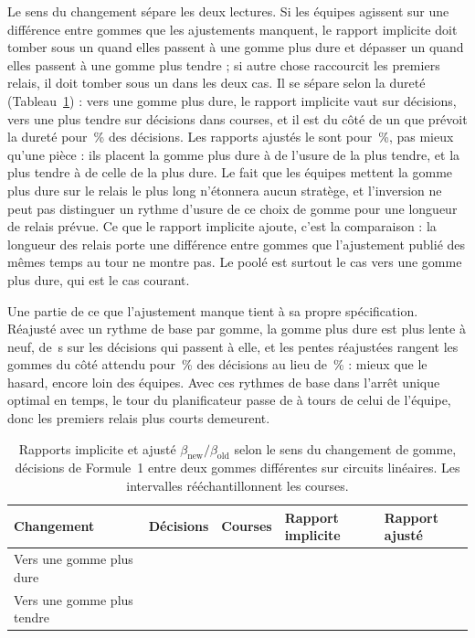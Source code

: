 \documentclass[11pt,a4paper]{article}
\begin{document}
Le sens du changement sépare les deux lectures. Si les équipes agissent sur une
différence entre gommes que les ajustements manquent, le rapport implicite doit
tomber sous un quand elles passent à une gomme plus dure et dépasser un quand
elles passent à une gomme plus tendre ; si autre chose raccourcit les premiers
relais, il doit tomber sous un dans les deux cas. Il se sépare selon la dureté
(Tableau~\ref{tab:direction}) : vers une gomme plus dure, le rapport implicite
vaut \ImpliedHarder{} \ImpliedHarderCi{} sur \ImpliedHarderN{} décisions, vers
une plus tendre \ImpliedSofter{} \ImpliedSofterCi{} sur \ImpliedSofterN{}
décisions dans \ImpliedSofterRaces{} courses, et il est du côté de un que
prévoit la dureté pour \ImpliedExpectedSide{}\,\% des décisions. Les rapports
ajustés le sont pour \ImpliedFittedExpectedSide{}\,\%, pas mieux qu'une pièce :
ils placent la gomme plus dure à \ImpliedFittedHarder{} de l'usure de la plus
tendre, et la plus tendre à \ImpliedFittedSofter{} de celle de la plus dure. Le
fait que les équipes mettent la gomme plus dure sur le relais le plus long
n'étonnera aucun stratège, et l'inversion ne peut pas distinguer un rythme
d'usure de ce choix de gomme pour une longueur de relais prévue. Ce que le
rapport implicite ajoute, c'est la comparaison : la longueur des relais porte
une différence entre gommes que l'ajustement publié des mêmes temps au tour ne
montre pas. Le \ImpliedRatio{}
poolé est surtout le cas vers une gomme plus dure, qui est le cas courant.

Une partie de ce que l'ajustement manque tient à sa propre spécification.
Réajusté avec un rythme de base par gomme, la gomme plus dure est plus lente à
neuf, de \OffsetHarder{}\,s \OffsetHarderCi{} sur les décisions qui passent à
elle, et les pentes réajustées rangent les gommes du côté attendu pour
\OffsetsFittedSide{}\,\% des décisions au lieu de \ImpliedFittedExpectedSide{}\,\% :
mieux que le hasard, encore loin des équipes. Avec ces rythmes de base dans
l'arrêt unique optimal en temps, le tour du planificateur passe de
\OffsetsGapPlain{} à \OffsetsGap{} tours \OffsetsGapCi{} de celui de l'équipe,
donc les premiers relais plus courts demeurent.

\begin{table}[htbp]
\centering
\caption{Rapports implicite et ajusté $\beta_{\mathrm{new}}/\beta_{\mathrm{old}}$
selon le sens du changement de gomme, décisions de Formule~1 entre deux gommes
différentes sur circuits linéaires. Les intervalles rééchantillonnent les
courses.}
\label{tab:direction}
\begin{tabular}{lrrll}
\toprule
Changement & Décisions & Courses & Rapport implicite & Rapport ajusté \\
\midrule
Vers une gomme plus dure & \ImpliedHarderN{} & \ImpliedHarderRaces{} & \ImpliedHarder{} \ImpliedHarderCi{} & \ImpliedFittedHarder{} \ImpliedFittedHarderCi{} \\
Vers une gomme plus tendre & \ImpliedSofterN{} & \ImpliedSofterRaces{} & \ImpliedSofter{} \ImpliedSofterCi{} & \ImpliedFittedSofter{} \ImpliedFittedSofterCi{} \\
\bottomrule
\end{tabular}
\end{table}
\end{document}
